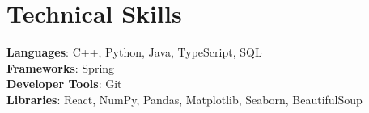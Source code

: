\documentclass[letterpaper,11pt]{article}
\begin{document}
\section{Technical Skills}
 \begin{itemize}[leftmargin=0.15in, label={}]
    \small{\item{
     \textbf{Languages}{: C++, Python, Java, TypeScript, SQL} \\
     \textbf{Frameworks}{: Spring} \\
     \textbf{Developer Tools}{: Git} \\
     \textbf{Libraries}{: React, NumPy, Pandas, Matplotlib, Seaborn, BeautifulSoup}
    }}
 \end{itemize}


\end{document}
